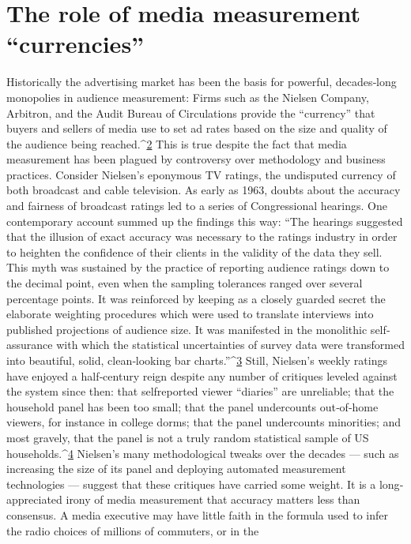 \section{The role of media measurement ``currencies''}
Historically the advertising market has been the basis for powerful,
decades‐long monopolies in audience measurement: Firms such as the
Nielsen Company, Arbitron, and the Audit Bureau of Circulations
provide the ``currency'' that buyers and sellers of media use to set ad rates
based on the size and quality of the audience being reached.^{\href{#endnotes}{2}} This is true
despite the fact that media measurement has been plagued by controversy
over methodology and business practices.
Consider Nielsen’s eponymous TV ratings, the undisputed currency of
both broadcast and cable television. As early as 1963, doubts about the
accuracy and fairness of broadcast ratings led to a series of Congressional
hearings. One contemporary account summed up the findings this way:
``The hearings suggested that the illusion of exact accuracy was
necessary to the ratings industry in order to heighten the
confidence of their clients in the validity of the data they sell. This
myth was sustained by the practice of reporting audience ratings
down to the decimal point, even when the sampling tolerances
ranged over several percentage points. It was reinforced by keeping
as a closely guarded secret the elaborate weighting procedures
which were used to translate interviews into published projections
of audience size. It was manifested in the monolithic self‐assurance
with which the statistical uncertainties of survey data were
transformed into beautiful, solid, clean‐looking bar charts.''^{\href{#endnotes}{3}}
Still, Nielsen’s weekly ratings have enjoyed a half‐century reign despite
any number of critiques leveled against the system since then: that selfreported
viewer ``diaries'' are unreliable; that the household panel has
been too small; that the panel undercounts out‐of‐home viewers, for
instance in college dorms; that the panel undercounts minorities; and most
gravely, that the panel is not a truly random statistical sample of US
households.^{\href{#endnotes}{4}} Nielsen’s many methodological tweaks over the decades —
such as increasing the size of its panel and deploying automated
measurement technologies — suggest that these critiques have carried
some weight.
It is a long‐appreciated irony of media measurement that accuracy matters
less than consensus. A media executive may have little faith in the
formula used to infer the radio choices of millions of commuters, or in the

